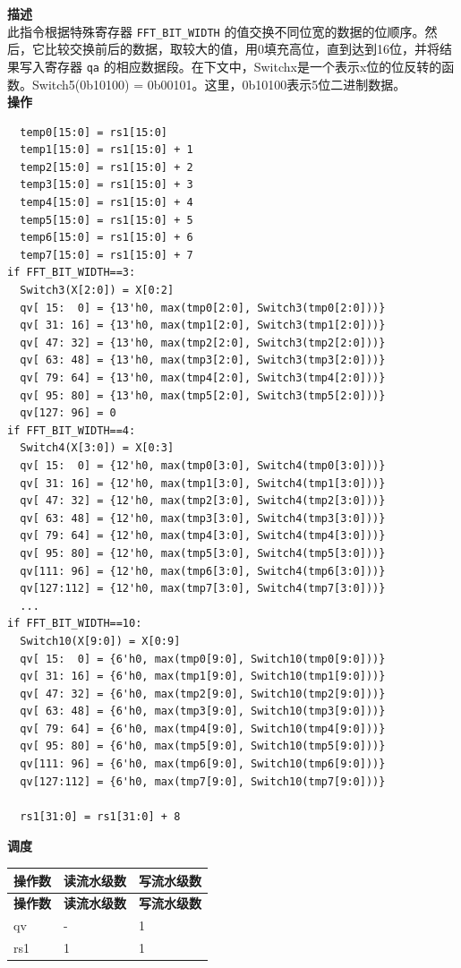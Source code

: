 \textbf{描述}\\
此指令根据特殊寄存器 \lstinline{FFT_BIT_WIDTH} 的值交换不同位宽的数据的位顺序。然后，它比较交换前后的数据，取较大的值，用0填充高位，直到达到16位，并将结果写入寄存器 \lstinline{qa} 的相应数据段。在下文中，Switchx是一个表示x位的位反转的函数。Switch5(0b10100) = 0b00101。这里，0b10100表示5位二进制数据。\\
\textbf{操作}
\begin{lstlisting}
  temp0[15:0] = rs1[15:0]
  temp1[15:0] = rs1[15:0] + 1
  temp2[15:0] = rs1[15:0] + 2
  temp3[15:0] = rs1[15:0] + 3
  temp4[15:0] = rs1[15:0] + 4
  temp5[15:0] = rs1[15:0] + 5
  temp6[15:0] = rs1[15:0] + 6
  temp7[15:0] = rs1[15:0] + 7
if FFT_BIT_WIDTH==3:
  Switch3(X[2:0]) = X[0:2]
  qv[ 15:  0] = {13'h0, max(tmp0[2:0], Switch3(tmp0[2:0]))}
  qv[ 31: 16] = {13'h0, max(tmp1[2:0], Switch3(tmp1[2:0]))}
  qv[ 47: 32] = {13'h0, max(tmp2[2:0], Switch3(tmp2[2:0]))}
  qv[ 63: 48] = {13'h0, max(tmp3[2:0], Switch3(tmp3[2:0]))}
  qv[ 79: 64] = {13'h0, max(tmp4[2:0], Switch3(tmp4[2:0]))}
  qv[ 95: 80] = {13'h0, max(tmp5[2:0], Switch3(tmp5[2:0]))}
  qv[127: 96] = 0
if FFT_BIT_WIDTH==4:
  Switch4(X[3:0]) = X[0:3]
  qv[ 15:  0] = {12'h0, max(tmp0[3:0], Switch4(tmp0[3:0]))}
  qv[ 31: 16] = {12'h0, max(tmp1[3:0], Switch4(tmp1[3:0]))}
  qv[ 47: 32] = {12'h0, max(tmp2[3:0], Switch4(tmp2[3:0]))}
  qv[ 63: 48] = {12'h0, max(tmp3[3:0], Switch4(tmp3[3:0]))}
  qv[ 79: 64] = {12'h0, max(tmp4[3:0], Switch4(tmp4[3:0]))}
  qv[ 95: 80] = {12'h0, max(tmp5[3:0], Switch4(tmp5[3:0]))}
  qv[111: 96] = {12'h0, max(tmp6[3:0], Switch4(tmp6[3:0]))}
  qv[127:112] = {12'h0, max(tmp7[3:0], Switch4(tmp7[3:0]))}
  ...
if FFT_BIT_WIDTH==10:
  Switch10(X[9:0]) = X[0:9]
  qv[ 15:  0] = {6'h0, max(tmp0[9:0], Switch10(tmp0[9:0]))}
  qv[ 31: 16] = {6'h0, max(tmp1[9:0], Switch10(tmp1[9:0]))}
  qv[ 47: 32] = {6'h0, max(tmp2[9:0], Switch10(tmp2[9:0]))}
  qv[ 63: 48] = {6'h0, max(tmp3[9:0], Switch10(tmp3[9:0]))}
  qv[ 79: 64] = {6'h0, max(tmp4[9:0], Switch10(tmp4[9:0]))}
  qv[ 95: 80] = {6'h0, max(tmp5[9:0], Switch10(tmp5[9:0]))}
  qv[111: 96] = {6'h0, max(tmp6[9:0], Switch10(tmp6[9:0]))}
  qv[127:112] = {6'h0, max(tmp7[9:0], Switch10(tmp7[9:0]))}

  rs1[31:0] = rs1[31:0] + 8
\end{lstlisting}

\textbf{调度}\\
\begin{longtable}[c]{|l|l|l|}
    \hline
    \rowcolor{lightgray}
    \textbf{操作数} & \textbf{读流水级数} & \textbf{写流水级数} \\\hline
    \endfirsthead
    \hline
    \rowcolor{lightgray}
     \textbf{操作数} & \textbf{读流水级数} & \textbf{写流水级数} \\\hline
    \endhead
    \hline
    \endfoot

  qv & - & 1 \\\hline
  rs1 & 1 & 1

\end{longtable}


